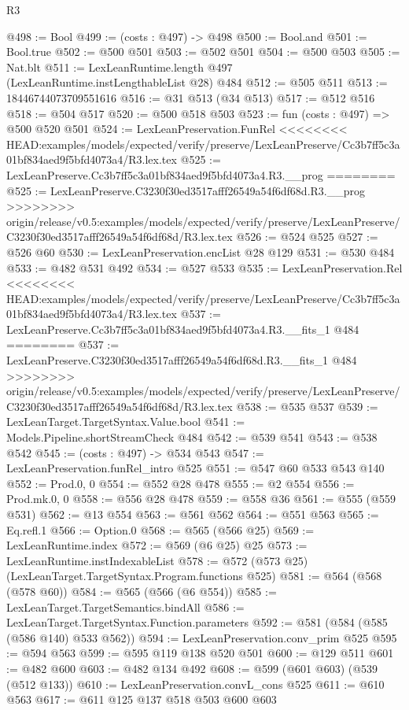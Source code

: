 \begin{lexlean}{R3}
\begin{coremodule}
{{{{{{{{{{{{{{{{{{{{{{{{{{@498 := Bool
@499 := (costs : @497) -> @498
@500 := Bool.and
@501 := Bool.true
@502 := @500 @501
@503 := @502 @501
@504 := @500 @503
@505 := Nat.blt
@511 := LexLeanRuntime.length @497 (LexLeanRuntime.instLengthableList @28) @484
@512 := @505 @511
@513 := 18446744073709551616
@516 := @31 @513 (@34 @513)
@517 := @512 @516
@518 := @504 @517
@520 := @500 @518 @503
@523 := fun (costs : @497) => @500 @520 @501
@524 := LexLeanPreservation.FunRel
<<<<<<<< HEAD:examples/models/expected/verify/preserve/LexLeanPreserve/Cc3b7ff5c3a01bf834aed9f5bfd4073a4/R3.lex.tex
@525 := LexLeanPreserve.Cc3b7ff5c3a01bf834aed9f5bfd4073a4.R3.__prog
========
@525 := LexLeanPreserve.C3230f30ed3517afff26549a54f6df68d.R3.__prog
>>>>>>>> origin/release/v0.5:examples/models/expected/verify/preserve/LexLeanPreserve/C3230f30ed3517afff26549a54f6df68d/R3.lex.tex
@526 := @524 @525
@527 := @526 @60
@530 := LexLeanPreservation.encList @28 @129
@531 := @530 @484
@533 := @482 @531 @492
@534 := @527 @533
@535 := LexLeanPreservation.Rel
<<<<<<<< HEAD:examples/models/expected/verify/preserve/LexLeanPreserve/Cc3b7ff5c3a01bf834aed9f5bfd4073a4/R3.lex.tex
@537 := LexLeanPreserve.Cc3b7ff5c3a01bf834aed9f5bfd4073a4.R3.__fits_1 @484
========
@537 := LexLeanPreserve.C3230f30ed3517afff26549a54f6df68d.R3.__fits_1 @484
>>>>>>>> origin/release/v0.5:examples/models/expected/verify/preserve/LexLeanPreserve/C3230f30ed3517afff26549a54f6df68d/R3.lex.tex
@538 := @535 @537
@539 := LexLeanTarget.TargetSyntax.Value.bool
@541 := Models.Pipeline.shortStreamCheck @484
@542 := @539 @541
@543 := @538 @542
@545 := (costs : @497) -> @534 @543
@547 := LexLeanPreservation.funRel_intro @525
@551 := @547 @60 @533 @543 @140
@552 := Prod.{0, 0}
@554 := @552 @28 @478
@555 := @2 @554
@556 := Prod.mk.{0, 0}
@558 := @556 @28 @478
@559 := @558 @36
@561 := @555 (@559 @531)
@562 := @13 @554
@563 := @561 @562
@564 := @551 @563
@565 := Eq.refl.{1}
@566 := Option.{0}
@568 := @565 (@566 @25)
@569 := LexLeanRuntime.index
@572 := @569 (@6 @25) @25
@573 := LexLeanRuntime.instIndexableList
@578 := @572 (@573 @25) (LexLeanTarget.TargetSyntax.Program.functions @525)
@581 := @564 (@568 (@578 @60))
@584 := @565 (@566 (@6 @554))
@585 := LexLeanTarget.TargetSemantics.bindAll
@586 := LexLeanTarget.TargetSyntax.Function.parameters
@592 := @581 (@584 (@585 (@586 @140) @533 @562))
@594 := LexLeanPreservation.conv_prim @525
@595 := @594 @563
@599 := @595 @119 @138 @520 @501
@600 := @129 @511
@601 := @482 @600
@603 := @482 @134 @492
@608 := @599 (@601 @603) (@539 (@512 @133))
@610 := LexLeanPreservation.convL_cons @525
@611 := @610 @563
@617 := @611 @125 @137 @518 @503 @600 @603
}}}}}}}}}}}}}}}}}}}}}}}}}}
\end{coremodule}
\end{lexlean}
